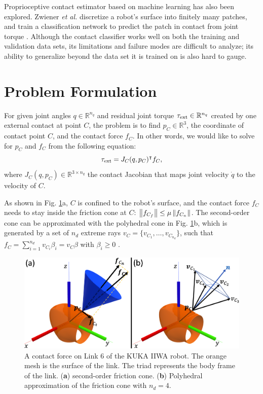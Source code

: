 Proprioceptive contact estimator based on machine learning has also been explored. Zwiener \textit{et al.} discretize a robot's surface into finitely many patches, and train a classification network to predict the patch in contact from joint torque \cite{zwiener2018contact}. Although the contact classifier works well on both the training and validation data sets, its limitations and failure modes are difficult to analyze; its ability to generalize beyond the data set it is trained on is also hard to gauge. 

\section{Problem Formulation \label{sec:problem_statement}}
For given joint angles $q \in \mathbb{R}^{n_q}$ and residual joint torque $\tau_{\text{ext}} \in \mathbb{R}^{n_q}$ created by one external contact at point $C$, the problem is to find $p_C \in \mathbb{R}^3$, the coordinate of contact point $C$, and the contact force $f_C$. In other words, we would like to solve for $p_C$ and $f_C$ from the following equation:
\begin{equation}
\label{eq:torque_jacobian_force}
\tau_{\text{ext}} = {J}_C({q}, {p}_C)^\intercal {f}_C,
\end{equation}
where ${J}_C({q}, {p}_C) \in \mathbb{R}^{3 \times n_q}$ the contact Jacobian that maps joint velocity $\dot{q}$ to the velocity of $C$. 

As shown in Fig. \ref{fig:friction_cone}a, $C$ is confined to the robot's surface, and the contact force ${f}_C$ needs to stay inside the friction cone at $C$: $\left\lVert{{f}_{C_f}}\right\rVert \leq \mu \left\lVert{{f}_{C_n}}\right\rVert$. The second-order cone can be approximated with the polyhedral cone in Fig. \ref{fig:friction_cone}b, which is generated by a set of $n_d$ extreme rays ${v}_C = \{{v}_{C_1}, \dots, {v}_{C_{n_d}}\}$, such that ${f}_C = \sum_{i=1}^{n_d} {v}_{C_i} \beta_i = {v}_C {\beta}$ with $\beta_i \geq 0$ \cite{stewart2000implicit}.    

\begin{figure}[h]
\centering
\includegraphics[width=0.98\linewidth]{figures/05_force_from_torque/friction_cone.png}
\caption{A contact force on Link 6 of the KUKA IIWA robot. The orange mesh is the surface of the link. The triad represents the body frame of the link. (\textbf{a}) second-order friction cone. (\textbf{b}) Polyhedral approximation of the friction cone with $n_d=4$.}
\label{fig:friction_cone}
\end{figure}

